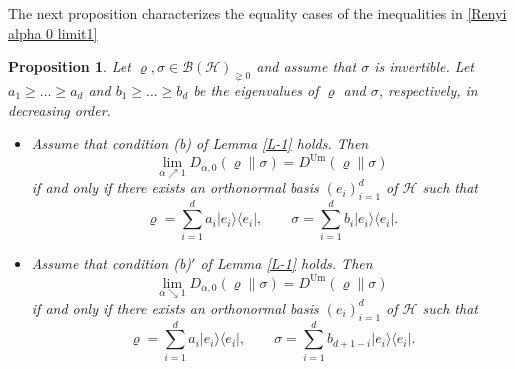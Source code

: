 \documentclass[unsortedaddress,superscriptaddress,pra,notitlepage]{revtex4}
\newtheorem{prop}[definition]{Proposition}
\def\B{{\mathcal B}}
\def\rho{\varrho}
\def\pne{_{\gneq 0}}
\def\cH{\mathcal{H}}
\def\<{\langle}
\def\>{\rangle}
\def\Um{\mathrm{Um}}
\def\<{\langle}
\def\>{\rangle}
\begin{document}
The next proposition characterizes the equality cases of the inequalities in \eqref{Renyi alpha 0 limit1}

\begin{prop}\label{P-2}
Let $\rho,\sigma\in\B(\cH)\pne$ and assume that $\sigma$ is invertible. Let
$a_1\ge\ldots\ge a_d$ and $b_1\ge\ldots\ge b_d$ be the eigenvalues of $\rho$ and
$\sigma$, respectively, in decreasing order.
\begin{itemize}
\item[(1)] Assume that condition (b) of Lemma \ref{L-1} holds. Then
\[
\lim_{\alpha\nearrow1}D_{\alpha,0}(\rho\|\sigma)=D^\Um(\rho\|\sigma)
\]
if and only if there exists an orthonormal basis $(e_i)_{i=1}^d$ of $\cH$ such that
\[
\rho=\sum_{i=1}^da_i|e_i\>\<e_i|,\qquad\sigma=\sum_{i=1}^db_i|e_i\>\<e_i|.
\]
\item[(2)] Assume that condition (b)$'$ of Lemma \ref{L-1} holds. Then
\[
\lim_{\alpha\searrow1}D_{\alpha,0}(\rho\|\sigma)=D^\Um(\rho\|\sigma)
\]
if and only if there exists an orthonormal basis $(e_i)_{i=1}^d$ of $\cH$ such that
\[
\rho=\sum_{i=1}^da_i|e_i\>\<e_i|,\qquad\sigma=\sum_{i=1}^db_{d+1-i}|e_i\>\<e_i|.
\]
\end{itemize}
\end{prop}
\end{document}
